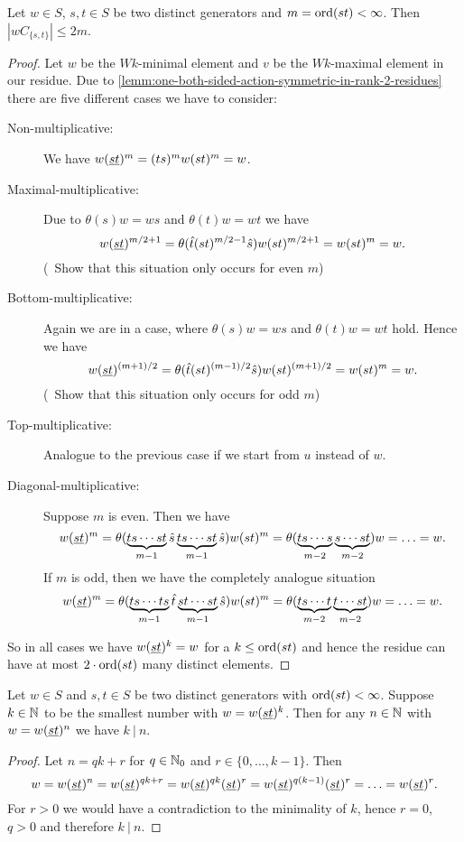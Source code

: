 \begin{lemm}
	Let $w \in S$, $s,t \in S$ be two distinct generators and $m = \operatorname{ord}(st) < \infty$. Then $|wC_{\{s,t\}}| \leq 2m$.

	\begin{proof}
		Let $w$ be the $Wk$-minimal element and $v$ be the $Wk$-maximal element in our residue. Due to \ref{lemm:one-both-sided-action-symmetric-in-rank-2-residues} there are five different cases we have to consider:
		\begin{description}
			\item[Non-multiplicative:] We have $w (\underline{s} \underline{t})^m = (ts)^m w (st)^m = w$.
			\item[Maximal-multiplicative:] Due to $\theta(s)w = ws$ and $\theta(t)w = wt$ we have
			$$ w (\underline{s} \underline{t})^{m/2+1} = \theta(\hat t (st)^{m/2-1} \hat s) w (st)^{m/2+1} = w(st)^m = w. $$
			(\todo \ Show that this situation only occurs for even $m$)
			\item[Bottom-multiplicative:] Again we are in a case, where $\theta(s)w = ws$ and $\theta(t)w = wt$ hold. Hence we have
			$$ w (\underline{s} \underline{t})^{(m+1)/2} = \theta(\hat t (st)^{(m-1)/2} \hat s) w (st)^{(m+1)/2} = w(st)^m = w. $$
			(\todo \ Show that this situation only occurs for odd $m$)
			\item[Top-multiplicative:] Analogue to the previous case if we start from $u$ instead of $w$.
			\item[Diagonal-multiplicative:] Suppose $m$ is even. Then we have
			$$ w (\underline{s} \underline{t})^m = \theta(\underbrace{ts \cdots st}_{m-1} \hat s \underbrace{ts \cdots st}_{m-1} \hat s) w (st)^m = \theta(\underbrace{ts \cdots s}_{m-2} \underbrace{s \cdots st}_{m-2}) w = \ldots = w. $$
			If $m$ is odd, then we have the completely analogue situation
			$$ w (\underline{s} \underline{t})^m = \theta(\underbrace{ts \cdots ts}_{m-1} \hat t \underbrace{st \cdots st}_{m-1} \hat s) w (st)^m = \theta(\underbrace{ts \cdots t}_{m-2} \underbrace{t \cdots st}_{m-2}) w = \ldots = w. $$
		\end{description}
		So in all cases we have $w (\underline{s} \underline{t})^k = w$ for a $k \leq \operatorname{ord}(st)$ and hence the residue can have at most $2 \cdot \operatorname{ord}(st)$ many distinct elements.
	\end{proof}
\end{lemm}

\begin{prop}
	Let $w \in S$ and $s,t \in S$ be two distinct generators with $\operatorname{ord}(st) < \infty$. Suppose $k \in \mathbb{N}$ to be the smallest number with $w = w(\underline{s} \underline{t})^k$. Then for any $n \in \mathbb{N}$ with $w = w(\underline{s} \underline{t})^n$ we have $k \ | \ n$.

	\begin{proof}
		Let $n = qk + r$ for $q \in \mathbb{N}_0$ and $r \in \{0,\ldots,k-1\}$. Then
		$$ w = w(\underline{s} \underline{t})^n = w(\underline{s} \underline{t})^{qk+r} = w(\underline{s} \underline{t})^{qk} (\underline{s} \underline{t})^r = w (\underline{s} \underline{t})^{q(k-1)} (\underline{s} \underline{t})^r = \ldots = w(\underline{s} \underline{t})^r. $$
		For $r > 0$ we would have a contradiction to the minimality of $k$, hence $r = 0$, $q > 0$ and therefore $k \ | \ n$.
	\end{proof}
\end{prop}

